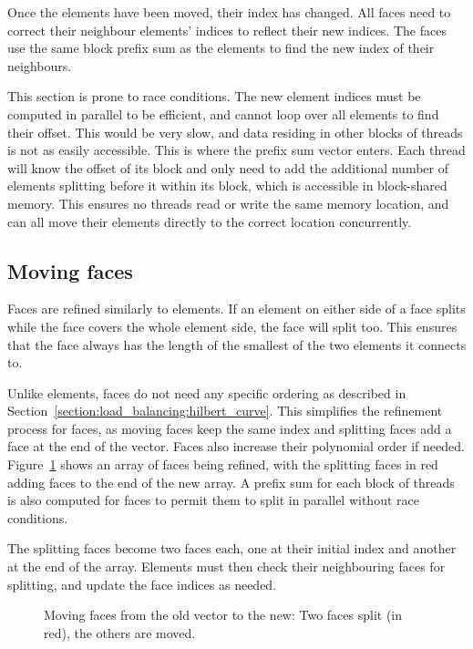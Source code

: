 Once the elements have been moved, their index has changed. All faces need to correct their
neighbour elements' indices to reflect their new indices. The faces use the same block prefix sum as
the elements to find the new index of their neighbours.

This section is prone to race conditions. The new element indices must be computed in parallel to be
efficient, and cannot loop over all elements to find their offset. This would be very slow, and data
residing in other blocks of threads is not as easily accessible. This is where the prefix sum vector
enters. Each thread will know the offset of its block and only need to add the additional number of
elements splitting before it within its block, which is accessible in block-shared memory. This
ensures no threads read or write the same memory location, and can all move their elements directly
to the correct location concurrently.

\subsection{Moving faces}\label{subsection:adaptive_mesh_refinement:implementation:moving_faces}

Faces are refined similarly to elements. If an element on either side of a face splits while the
face covers the whole element side, the face will split too. This ensures that the face always has
the length of the smallest of the two elements it connects to. 

Unlike elements, faces do not need any specific ordering as described in
Section~\ref{section:load_balancing:hilbert_curve}. This simplifies the refinement process for
faces, as moving faces keep the same index and splitting faces add a face at the end of the vector.
Faces also increase their polynomial order if needed. Figure~\ref{fig:refinement_offset_face} shows
an array of faces being refined, with the splitting faces in red adding faces to the end of the new
array. A prefix sum for each block of threads is also computed for faces to permit them to split in
parallel without race conditions.

The splitting faces become two faces each, one at their initial index and another at the end of the
array. Elements must then check their neighbouring faces for splitting, and update the face indices
as needed.

\begin{figure}[H]
    \centering
    
    \caption{Moving faces from the old vector to the new: Two faces split (in red), the others are moved.}\label{fig:refinement_offset_face}
\end{figure}
